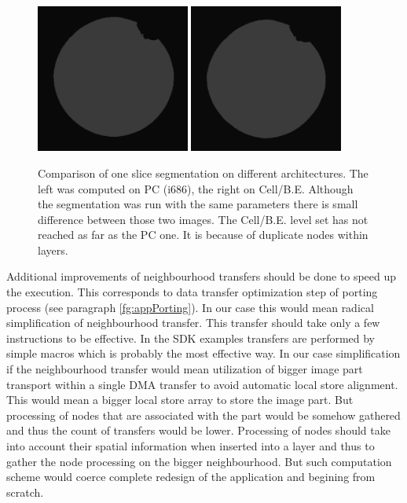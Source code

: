 \begin{figure}
    \centering
    \includegraphics[width=0.45\textwidth]{data/png/pcSlice}
    \includegraphics[width=0.45\textwidth]{data/png/cellSlice}
    \caption[Comparison of one slice segmented on different architectures]{Comparison of one slice segmentation on different architectures.
The left was computed on PC (i686), the right on \mbox{Cell/B.E.}
Although the segmentation was run with the same parameters there is small difference between those two images.
The \mbox{Cell/B.E.} level set has not reached as far as the PC one.
It is because of duplicate nodes within layers.
}
    \label{fg:sliceComparison}
\end{figure}

\par
Additional improvements of neighbourhood transfers should be done to speed up the execution.
This corresponds to data transfer optimization step of porting process (see paragraph \ref{fg:appPorting}).
In our case this would mean radical simplification of neighbourhood transfer.
This transfer should take only a few instructions to be effective.
In the SDK examples transfers are performed by simple macros which is probably the most effective way.
In our case simplification if the neighbourhood transfer would mean utilization of bigger image part transport within a single DMA transfer to avoid automatic local store alignment.
This would mean a bigger local store array to store the image part.
But processing of nodes that are associated with the part would be somehow gathered and thus the count of transfers would be lower.
Processing of nodes should take into account their spatial information when inserted into a layer and thus to gather the node processing on the bigger neighbourhood.
But such computation scheme would coerce complete redesign of the application and begining from scratch.

